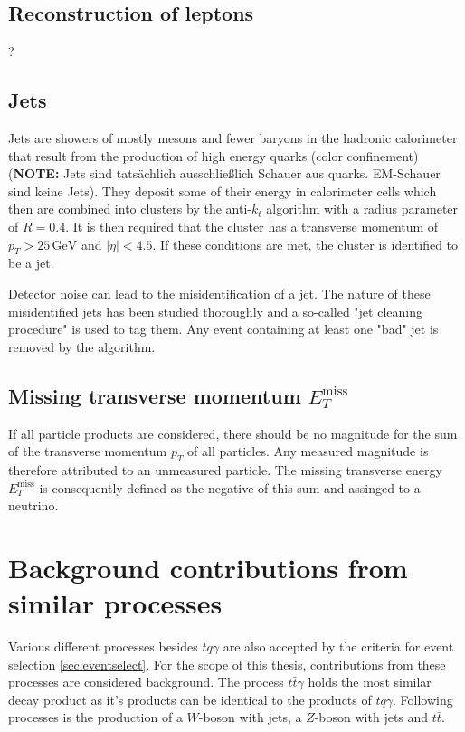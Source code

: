 \subsection{Reconstruction of leptons}
\label{sec:reconlepton}
?
\subsection{Jets}
\label{sec:jets}
Jets are showers of mostly mesons and fewer baryons in the hadronic calorimeter that result from the production of high energy quarks (color confinement) (\textbf{NOTE: }Jets sind tatsächlich ausschließlich Schauer aus quarks. EM-Schauer sind keine Jets). They deposit some of their energy in calorimeter cells which then are combined into clusters by the anti-$k_t$ algorithm \cite{anti_k_t} with a radius parameter of $R = 0.4$. 
It is then required that the cluster has a transverse momentum of $p_T > 25 \,\si{\giga\electronvolt}$ and $\bigl|\eta\bigr| < 4.5$. If these conditions are met, the cluster is identified to be a jet.

Detector noise can lead to the misidentification of a jet. The nature of these misidentified jets has been studied thoroughly and a so-called "jet cleaning procedure" is used to tag them. 
Any event containing at least one "bad" jet is removed by the algorithm. 

\subsection{Missing transverse momentum \texorpdfstring{$E_T^{\text{miss}}$}{}}

If all particle products are considered, there should be no magnitude for the sum of the transverse momentum $p_T$ of all particles. 
Any measured magnitude is therefore attributed to an unmeasured particle. The missing transverse energy $E_T^{\text{miss}}$ is consequently defined as the negative of this sum and assinged to a neutrino. 

\section{Background contributions from similar processes}



Various different processes besides $tq\gamma$ are also accepted by the criteria for event selection \ref{sec:eventselect}. For the scope of this thesis, contributions from these processes are considered background.  
The process $t\bar{t}\gamma$ holds the most similar decay product as it's products can be identical to the products of $tq\gamma$. %
Following processes is the production of a $W$-boson with jets, a $Z$-boson with jets and $t\bar{t}$.

